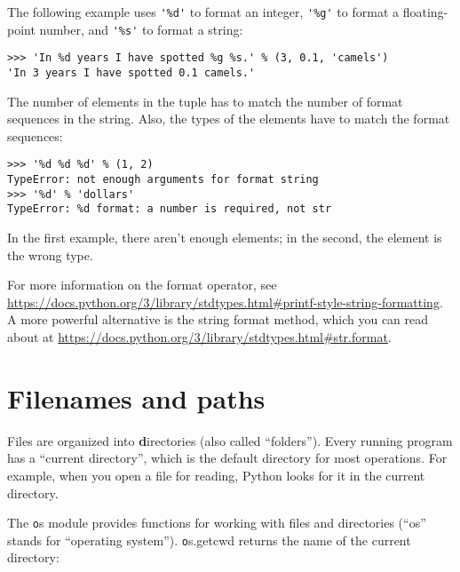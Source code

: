 \documentclass[
DIV=11,
fontsize=13,
twoside,
headinclude=false,
titlepage=firstiscover,
abstract=true,
headsepline=true,
footsepline=true,
chapterprefix=true, %
headings=big,
bibliography=totoc,%
captions=tableheading
]{scrbook}
\theoremstyle{definition}
\begin{document}
The following example uses \verb"'%d'" to format an integer,
\verb"'%g'" to format a floating-point number, and
\verb"'%s'" to format a string:

\begin{lstlisting}
>>> 'In %d years I have spotted %g %s.' % (3, 0.1, 'camels')
'In 3 years I have spotted 0.1 camels.'
\end{lstlisting}
%
The number of elements in the tuple has to match the number
of format sequences in the string.  Also, the types of the
elements have to match the format sequences:

\begin{lstlisting}
>>> '%d %d %d' % (1, 2)
TypeError: not enough arguments for format string
>>> '%d' % 'dollars'
TypeError: %d format: a number is required, not str
\end{lstlisting}
%
In the first example, there aren't enough elements; in the
second, the element is the wrong type.

For more information on the format operator, see
\url{https://docs.python.org/3/library/stdtypes.html#printf-style-string-formatting}.  A more powerful alternative is the string
format method, which you can read about at
\url{https://docs.python.org/3/library/stdtypes.html#str.format}.




\section{Filenames and paths}
\label{paths}

Files are organized into {\textbf directories} (also called ``folders'').
Every running program has a ``current directory'', which is the
default directory for most operations.  
For example, when you open a file for reading, Python looks for it in the
current directory.

The {\texttt os} module provides functions for working with files and
directories (``os'' stands for ``operating system'').  {\texttt os.getcwd}
returns the name of the current directory:
\end{document}
